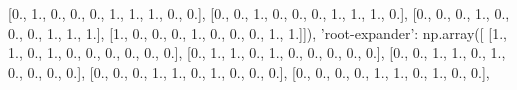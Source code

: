 \documentclass[11pt]{article}
\newenvironment{Shaded}{}{}
\newcommand{\DecValTok}[1]{\textcolor[rgb]{0.25,0.63,0.44}{{#1}}}
\newcommand{\StringTok}[1]{\textcolor[rgb]{0.25,0.44,0.63}{{#1}}}
\newcommand{\NormalTok}[1]{{#1}}
\begin{document}
\begin{Shaded}
\begin{Highlighting}[]
\NormalTok{        [}\DecValTok{0}\NormalTok{., }\DecValTok{1}\NormalTok{., }\DecValTok{0}\NormalTok{., }\DecValTok{0}\NormalTok{., }\DecValTok{0}\NormalTok{., }\DecValTok{1}\NormalTok{., }\DecValTok{1}\NormalTok{., }\DecValTok{1}\NormalTok{., }\DecValTok{0}\NormalTok{., }\DecValTok{0}\NormalTok{.],}
\NormalTok{        [}\DecValTok{0}\NormalTok{., }\DecValTok{0}\NormalTok{., }\DecValTok{1}\NormalTok{., }\DecValTok{0}\NormalTok{., }\DecValTok{0}\NormalTok{., }\DecValTok{0}\NormalTok{., }\DecValTok{1}\NormalTok{., }\DecValTok{1}\NormalTok{., }\DecValTok{1}\NormalTok{., }\DecValTok{0}\NormalTok{.],}
\NormalTok{        [}\DecValTok{0}\NormalTok{., }\DecValTok{0}\NormalTok{., }\DecValTok{0}\NormalTok{., }\DecValTok{1}\NormalTok{., }\DecValTok{0}\NormalTok{., }\DecValTok{0}\NormalTok{., }\DecValTok{0}\NormalTok{., }\DecValTok{1}\NormalTok{., }\DecValTok{1}\NormalTok{., }\DecValTok{1}\NormalTok{.],}
\NormalTok{        [}\DecValTok{1}\NormalTok{., }\DecValTok{0}\NormalTok{., }\DecValTok{0}\NormalTok{., }\DecValTok{0}\NormalTok{., }\DecValTok{1}\NormalTok{., }\DecValTok{0}\NormalTok{., }\DecValTok{0}\NormalTok{., }\DecValTok{0}\NormalTok{., }\DecValTok{1}\NormalTok{., }\DecValTok{1}\NormalTok{.]]),}
    \StringTok{'root-expander'}\NormalTok{: np.array([}
\NormalTok{        [}\DecValTok{1}\NormalTok{., }\DecValTok{1}\NormalTok{., }\DecValTok{0}\NormalTok{., }\DecValTok{1}\NormalTok{., }\DecValTok{0}\NormalTok{., }\DecValTok{0}\NormalTok{., }\DecValTok{0}\NormalTok{., }\DecValTok{0}\NormalTok{., }\DecValTok{0}\NormalTok{., }\DecValTok{0}\NormalTok{.],}
\NormalTok{        [}\DecValTok{0}\NormalTok{., }\DecValTok{1}\NormalTok{., }\DecValTok{1}\NormalTok{., }\DecValTok{0}\NormalTok{., }\DecValTok{1}\NormalTok{., }\DecValTok{0}\NormalTok{., }\DecValTok{0}\NormalTok{., }\DecValTok{0}\NormalTok{., }\DecValTok{0}\NormalTok{., }\DecValTok{0}\NormalTok{.],}
\NormalTok{        [}\DecValTok{0}\NormalTok{., }\DecValTok{0}\NormalTok{., }\DecValTok{1}\NormalTok{., }\DecValTok{1}\NormalTok{., }\DecValTok{0}\NormalTok{., }\DecValTok{1}\NormalTok{., }\DecValTok{0}\NormalTok{., }\DecValTok{0}\NormalTok{., }\DecValTok{0}\NormalTok{., }\DecValTok{0}\NormalTok{.],}
\NormalTok{        [}\DecValTok{0}\NormalTok{., }\DecValTok{0}\NormalTok{., }\DecValTok{0}\NormalTok{., }\DecValTok{1}\NormalTok{., }\DecValTok{1}\NormalTok{., }\DecValTok{0}\NormalTok{., }\DecValTok{1}\NormalTok{., }\DecValTok{0}\NormalTok{., }\DecValTok{0}\NormalTok{., }\DecValTok{0}\NormalTok{.],}
\NormalTok{        [}\DecValTok{0}\NormalTok{., }\DecValTok{0}\NormalTok{., }\DecValTok{0}\NormalTok{., }\DecValTok{0}\NormalTok{., }\DecValTok{1}\NormalTok{., }\DecValTok{1}\NormalTok{., }\DecValTok{0}\NormalTok{., }\DecValTok{1}\NormalTok{., }\DecValTok{0}\NormalTok{., }\DecValTok{0}\NormalTok{.],}

\end{Highlighting}
\end{Shaded}
\end{document}
